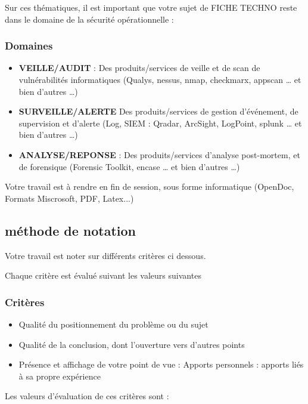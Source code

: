 Sur ces thématiques, il est important que votre sujet de FICHE TECHNO reste dans le domaine de la sécurité opérationnelle :

\begin{frame}
\frametitle<presentation>{Domaines}
\begin{itemize}
  \item \textbf{VEILLE/AUDIT} : Des produits/services de veille et de scan de vulnérabilités informatiques (Qualys, nessus, nmap, checkmarx, appscan … et bien d’autres …) 
  \item \textbf{SURVEILLE/ALERTE} Des produits/services de gestion d’événement, de supervision et d’alerte (Log, SIEM : Qradar, ArcSight, LogPoint, splunk … et bien d’autres …)
  \item \textbf{ANALYSE/REPONSE} : Des produits/services d’analyse post-mortem, et de forensique (Forensic Toolkit, encase … et bien d’autres …)
\end{itemize}

\end{frame}

Votre travail est à rendre en fin de session, sous forme informatique (OpenDoc, Formats Miscrosoft, PDF, Latex...)

\subsection{méthode de notation}

Votre travail est noter sur différents critères ci dessous.



Chaque critère est évalué suivant les valeurs suivantes

\begin{frame}
\frametitle<presentation>{Critères}

\begin{itemize}
  \item Qualité du positionnement du problème ou du sujet
  \item Qualité de la conclusion, dont l'ouverture vers d'autres points
  \item Présence et affichage de votre point de vue : Apports personnels : apports liés à sa propre expérience
\end{itemize}

\end{frame}
Les valeurs d'évaluation de ces critères sont :

